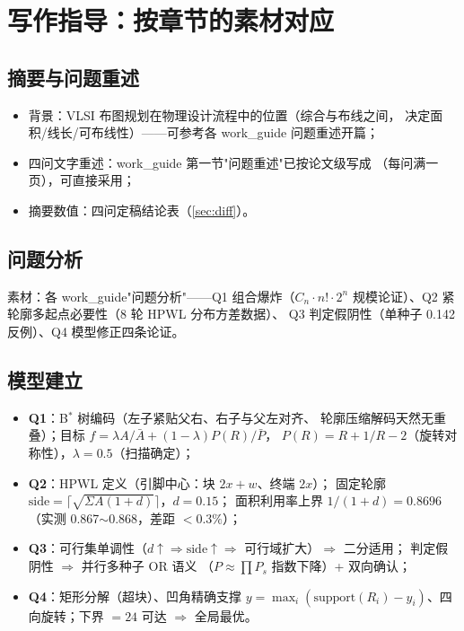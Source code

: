 \documentclass[12pt,a4paper]{article}
\begin{document}
\section{写作指导：按章节的素材对应}

\subsection{摘要与问题重述}

\begin{itemize}
    \item 背景：VLSI 布图规划在物理设计流程中的位置（综合与布线之间，
    决定面积/线长/可布线性）——可参考各 work\_guide 问题重述开篇；
    \item 四问文字重述：work\_guide 第一节"问题重述"已按论文级写成
    （每问满一页），可直接采用；
    \item 摘要数值：四问定稿结论表（\ref{sec:diff}）。
\end{itemize}

\subsection{问题分析}

素材：各 work\_guide"问题分析"——Q1 组合爆炸（$C_n\cdot n!\cdot2^n$
规模论证）、Q2 紧轮廓多起点必要性（8 轮 HPWL 分布方差数据）、
Q3 判定假阴性（单种子 0.142 反例）、Q4 模型修正四条论证。

\subsection{模型建立}

\begin{itemize}
    \item \textbf{Q1}：B$^*$ 树编码（左子紧贴父右、右子与父左对齐、
    轮廓压缩解码天然无重叠）；目标
    $f = \lambda A/\bar A + (1-\lambda)P(R)/\bar P$，
    $P(R)=R+1/R-2$（旋转对称性），$\lambda=0.5$（扫描确定）；
    \item \textbf{Q2}：HPWL 定义（引脚中心：块 $2x+w$、终端 $2x$）；
    固定轮廓 $\text{side}=\lceil\sqrt{\Sigma A(1+d)}\rceil$，$d=0.15$；
    面积利用率上界 $1/(1+d)=0.8696$（实测 0.867$\sim$0.868，差距 $<0.3\%$）；
    \item \textbf{Q3}：可行集单调性（$d\uparrow \Rightarrow \text{side}
    \uparrow \Rightarrow$ 可行域扩大）$\Rightarrow$ 二分适用；
    判定假阴性 $\Rightarrow$ 并行多种子 OR 语义
    （$P \approx \prod P_s$ 指数下降）+ 双向确认；
    \item \textbf{Q4}：矩形分解（超块）、凹角精确支撑
    $y=\max_i(\text{support}(R_i)-y_i)$、四向旋转；下界 $=24$ 可达
    $\Rightarrow$ 全局最优。
\end{itemize}
\end{document}
